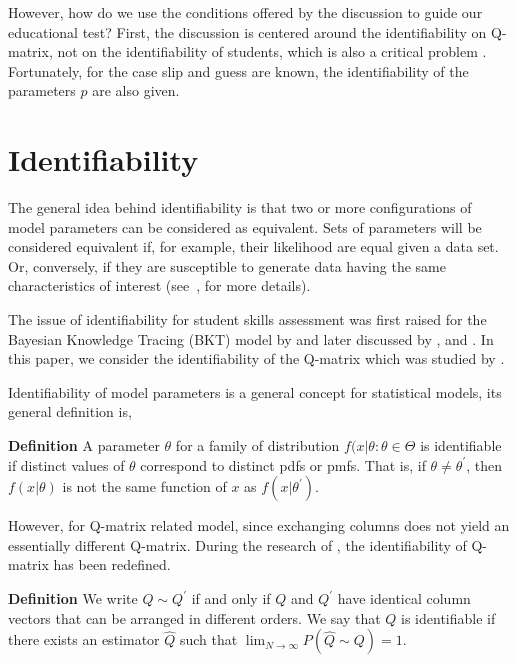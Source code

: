 \documentclass{edm_template}
\begin{document}
However, how do we use the conditions offered by the discussion to guide our educational test? First, the discussion is centered around the identifiability on Q-matrix, not on the identifiability of students, which is also a critical problem \cite{beck2007identifiability}. Fortunately, for the case slip and guess are known, the identifiability of the parameters $p$ are also given\cite{chen2015statistical}.  
\section{Identifiability}

The general idea behind identifiability is that two or more configurations of model parameters can be considered as equivalent.  Sets of parameters will be considered equivalent if, for example, their likelihood are equal given a data set.  Or, conversely, if they are susceptible to generate data having the same characteristics of interest (see~, for more details).

The issue of identifiability for student skills assessment was first raised for the Bayesian Knowledge Tracing (BKT) model by  and later discussed by , and .  In this paper, we consider the identifiability of the Q-matrix which was studied by  .  

Identifiability of model parameters is a general concept for statistical models, its general definition is,

\textbf{Definition} \cite{casella2002statistical} A parameter $\theta$ for a family of distribution ${f(x|\theta: \theta \in \Theta}$ is identifiable if distinct values of $\theta$ correspond to distinct pdfs or pmfs. That is, if $\theta \neq \theta^{\prime}$, then $f(x|\theta)$ is not the same function of $x$ as $f(x|\theta^{\prime})$.

However, for Q-matrix related model, since exchanging columns does not yield an essentially different Q-matrix. During the research of , the identifiability of Q-matrix has been redefined.

\textbf{Definition} \cite{xu2015identifiability} We write $Q \sim Q^{\prime}$ if and only if $Q$ and $Q^{\prime}$ have identical column vectors that can be arranged in different orders. We say that $Q$ is identifiable if there exists an estimator $\hat{Q}$ such that $\lim_{N\to\infty} P(\hat{Q} \sim Q) = 1$.
\end{document}
